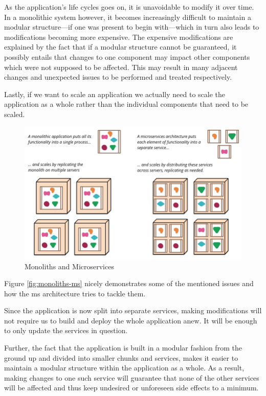 As the application's life cycles goes on, it is unavoidable to modify
it over time. In a monolithic system however, it becomes increasingly
difficult to maintain a modular structure---if one was present to
begin with---which in turn also leads to modifications becoming more
expensive. The expensive modifications are explained by the fact that
if a modular structure cannot be guaranteed, it possibly entails that
changes to one component may impact other components which were not
supposed to be affected. This may result in many adjacent changes and
unexpected issues to be performed and treated respectively.

Lastly, if we want to scale an application we actually need to scale
the application as a whole rather than the individual components that
need to be scaled.

\begin{figure}
	\centering
	\includegraphics[width=0.75\linewidth]{images/sketch.png}
	\caption{Monoliths and Microservices}
	\label{fig:monoliths-ms}
\end{figure}

Figure \vref{fig:monoliths-ms} nicely demonstrates some of the
mentioned issues and how the \gls{ms} architecture tries to tackle
them.

Since the application is now split into separate services, making
modifications will not require us to build and deploy the whole
application anew. It will be enough to only update the services in
question.

Further, the fact that the application is built in a modular fashion
from the ground up and divided into smaller chunks and services, makes
it easier to maintain a modular structure within the application as a
whole. As a result, making changes to one such service will guarantee
that none of the other services will be affected and thus keep
undesired or unforeseen side effects to a minimum.

